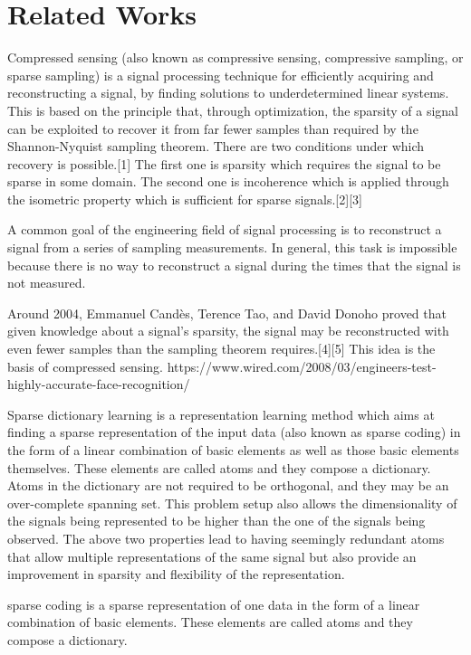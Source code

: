 \section{Related Works}

Compressed sensing (also known as compressive sensing, compressive sampling, or sparse sampling) is a signal processing technique for efficiently acquiring and reconstructing a signal, by finding solutions to underdetermined linear systems. This is based on the principle that, through optimization, the sparsity of a signal can be exploited to recover it from far fewer samples than required by the Shannon-Nyquist sampling theorem. There are two conditions under which recovery is possible.[1] The first one is sparsity which requires the signal to be sparse in some domain. The second one is incoherence which is applied through the isometric property which is sufficient for sparse signals.[2][3]

A common goal of the engineering field of signal processing is to reconstruct a signal from a series of sampling measurements. In general, this task is impossible because there is no way to reconstruct a signal during the times that the signal is not measured.

Around 2004, Emmanuel Candès, Terence Tao, and David Donoho proved that given knowledge about a signal's sparsity, the signal may be reconstructed with even fewer samples than the sampling theorem requires.[4][5] This idea is the basis of compressed sensing. 	https://www.wired.com/2008/03/engineers-test-highly-accurate-face-recognition/

Sparse dictionary learning is a representation learning method which aims at finding a sparse representation of the input data (also known as sparse coding) in the form of a linear combination of basic elements as well as those basic elements themselves. These elements are called atoms and they compose a dictionary. Atoms in the dictionary are not required to be orthogonal, and they may be an over-complete spanning set. This problem setup also allows the dimensionality of the signals being represented to be higher than the one of the signals being observed. The above two properties lead to having seemingly redundant atoms that allow multiple representations of the same signal but also provide an improvement in sparsity and flexibility of the representation.

sparse coding is a sparse representation of one data in the form of a linear combination of basic elements. These elements are called atoms and they compose a dictionary.

